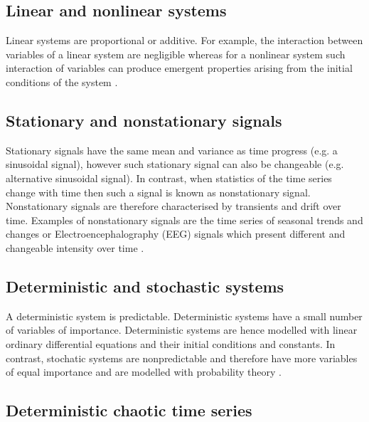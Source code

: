 \subsection{Linear and nonlinear systems}
Linear systems are proportional or additive. For example, the interaction 
between variables of a linear system are negligible whereas for a nonlinear 
system such interaction of variables can produce emergent properties 
arising from the initial conditions of the system \citep{klonowski2007}.

\subsection{Stationary and nonstationary signals}
Stationary signals have the same mean and variance as time progress (e.g. 
a sinusoidal signal), however such stationary signal can also be changeable
(e.g. alternative sinusoidal signal).
In contrast, when statistics of the time series change with time then 
such a signal is known as nonstationary signal.
Nonstationary signals are therefore characterised by transients and 
drift over time. Examples of nonstationary signals are the time series of 
seasonal trends and changes \citep{kitagawa1984} or Electroencephalography (EEG) 
signals which present different and changeable intensity over time 
\citep{klonowski2007}.

\subsection{Deterministic and stochastic systems}
A deterministic system is predictable. Deterministic systems 
have a small number of variables of importance. 
Deterministic systems are hence modelled with linear ordinary 
differential equations and their initial conditions and constants.
In contrast, stochatic systems are nonpredictable and therefore have 
more variables of equal importance and are 
modelled with probability theory \citep{klonowski2007}.

\subsection{Deterministic chaotic time series}

